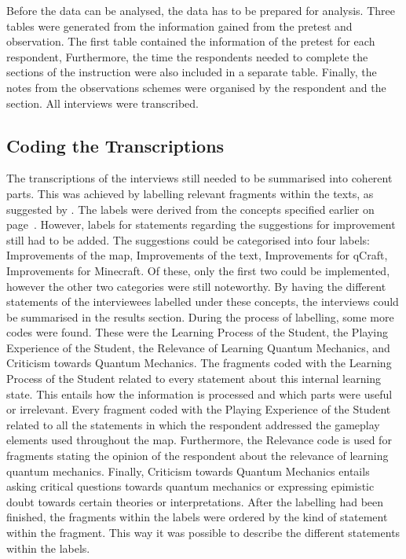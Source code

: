\documentclass[11pt,twoside]{report} %
\begin{document}
Before the data can be analysed, the data has to be prepared for analysis. Three tables were generated from the information gained from the pretest and observation. The first table contained the information of the pretest for each respondent, Furthermore, the time the respondents needed to complete the sections of the instruction were also included in a separate table. Finally, the notes from the observations schemes were organised by the respondent and the section. All interviews were transcribed.

\subsection{Coding the Transcriptions}

The transcriptions of the interviews still needed to be summarised into coherent parts. This was achieved by labelling relevant fragments within the texts, as suggested by . The labels were derived from the concepts specified earlier on page~\pageref{subsec:evaconcepts}. However, labels for statements regarding the suggestions for improvement still had to be added. The suggestions could be categorised into four labels: Improvements of the map, Improvements of the text, Improvements for qCraft, Improvements for Minecraft. Of these, only the first two could be implemented, however the other two categories were still noteworthy. By having the different statements of the interviewees labelled under these concepts, the interviews could be summarised in the results section. During the process of labelling, some more codes were found. These were the Learning Process of the Student, the Playing Experience of the Student, the Relevance of Learning Quantum Mechanics, and Criticism towards Quantum Mechanics. The fragments coded with the Learning Process of the Student related to every statement about this internal learning state. This entails how the information is processed and which parts were useful or irrelevant. Every fragment coded with the Playing Experience of the Student related to all the statements in which the respondent addressed the gameplay elements used throughout the map. Furthermore, the Relevance code is used for fragments stating the opinion of the respondent about the relevance of learning quantum mechanics. Finally, Criticism towards Quantum Mechanics entails asking critical questions towards quantum mechanics or expressing epimistic doubt towards certain theories or interpretations. After the labelling had been finished, the fragments within the labels were ordered by the kind of statement within the fragment. This way it was possible to describe the different statements within the labels.
\end{document}
